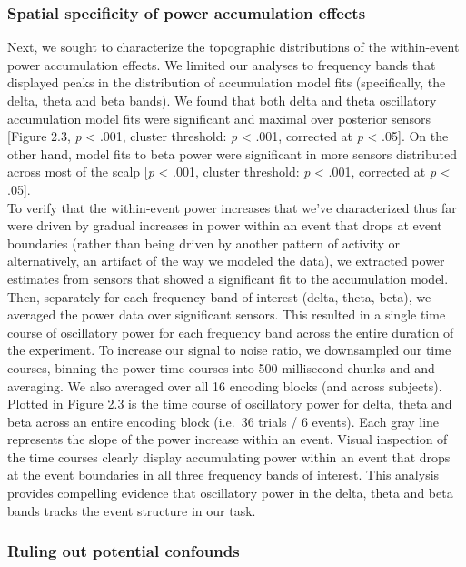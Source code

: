 \subsubsection{Spatial specificity of power accumulation
effects}\label{spatial-specificity-of-power-accumulation-effects}

Next, we sought to characterize the topographic distributions of the
within-event power accumulation effects. We limited our analyses to
frequency bands that displayed peaks in the distribution of accumulation
model fits (specifically, the delta, theta and beta bands). We found
that both delta and theta oscillatory accumulation model fits were
significant and maximal over posterior sensors {[}Figure 2.3, \emph{p}
\textless{} .001, cluster threshold: \emph{p} \textless{} .001,
corrected at \emph{p} \textless{} .05{]}. On the other hand, model fits
to beta power were significant in more sensors distributed across most
of the scalp {[}\emph{p} \textless{} .001, cluster threshold: \emph{p}
\textless{} .001, corrected at \emph{p} \textless{} .05{]}.\\
To verify that the within-event power increases that we've characterized
thus far were driven by gradual increases in power within an event that
drops at event boundaries (rather than being driven by another pattern
of activity or alternatively, an artifact of the way we modeled the
data), we extracted power estimates from sensors that showed a
significant fit to the accumulation model. Then, separately for each
frequency band of interest (delta, theta, beta), we averaged the power
data over significant sensors. This resulted in a single time course of
oscillatory power for each frequency band across the entire duration of
the experiment. To increase our signal to noise ratio, we downsampled
our time courses, binning the power time courses into 500 millisecond
chunks and and averaging. We also averaged over all 16 encoding blocks
(and across subjects). Plotted in Figure 2.3 is the time course of
oscillatory power for delta, theta and beta across an entire encoding
block (i.e.~36 trials / 6 events). Each gray line represents the slope
of the power increase within an event. Visual inspection of the time
courses clearly display accumulating power within an event that drops at
the event boundaries in all three frequency bands of interest. This
analysis provides compelling evidence that oscillatory power in the
delta, theta and beta bands tracks the event structure in our task.

\subsubsection{Ruling out potential
confounds}\label{ruling-out-potential-confounds}

